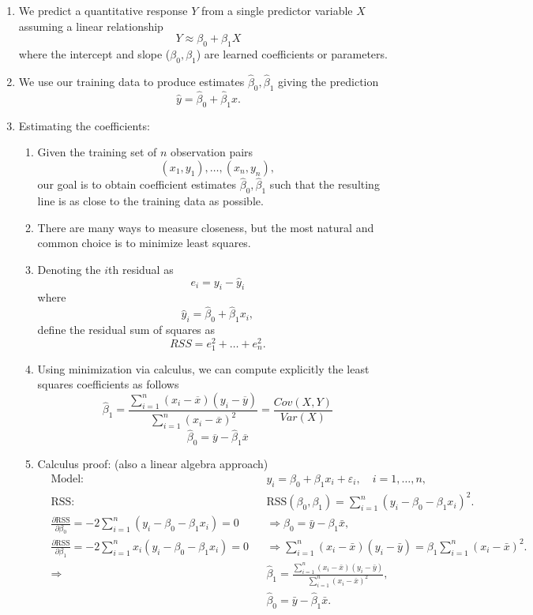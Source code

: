 \documentclass{article}
\begin{document}
\begin{enumerate}
\item We predict a quantitative response $Y$ from a single predictor variable $X$ assuming a linear relationship
\[
Y \approx \beta_0 + \beta_1 X
\]
where the intercept and slope ($\beta_0, \beta_1$) are learned coefficients or parameters.

\item We use our training data to produce estimates $\hat{\beta}_0, \hat{\beta}_1$ giving the prediction
\[
\hat{y} = \hat{\beta}_0 + \hat{\beta}_1 x.
\]

\item Estimating the coefficients:
\begin{enumerate}
\item Given the training set of $n$ observation pairs
\[
(x_1, y_1), \dots , (x_n, y_n),
\]
our goal is to obtain coefficient estimates $\hat{\beta}_0, \hat{\beta}_1$ such that the resulting line is as close to the training data as possible. 
\item There are many ways to measure closeness, but the most natural and common choice is to minimize least squares.
\item Denoting the $i$th residual as 
\[
e_i = y_i - \hat{y}_i
\]
where
\[
\hat{y}_i = \hat{\beta}_0 + \hat{\beta}_1 x_i,
\]
define the residual sum of squares as
\[
RSS = e_1^2 + \dots + e_n^2.
\]
\item Using minimization via calculus, we can compute explicitly the least squares coefficients as follows
\[
\hat{\beta}_1 = \frac{\sum_{i=1}^n (x_i - \overline{x})(y_i - \overline{y})}{\sum_{i=1}^n (x_i - \overline{x})^2} = \frac{Cov(X,Y)}{Var(X)}
\]\[
\hat{\beta}_0 = \overline{y}-\hat{\beta}_1\overline{x}
\]
\item Calculus proof: (also a linear algebra approach)
\begin{align*}
&\text{Model:} && y_i = \beta_0 + \beta_1 x_i + \varepsilon_i, \quad i = 1,\dots,n, \\[2pt]
&\text{RSS:} && \mathrm{RSS}(\beta_0,\beta_1) = \sum_{i=1}^n (y_i - \beta_0 - \beta_1 x_i)^2. \\[4pt]
&\frac{\partial \mathrm{RSS}}{\partial \beta_0} = -2 \sum_{i=1}^n (y_i - \beta_0 - \beta_1 x_i) = 0 
&&\Rightarrow \beta_0 = \bar{y} - \beta_1 \bar{x}, \\[4pt]
&\frac{\partial \mathrm{RSS}}{\partial \beta_1} = -2 \sum_{i=1}^n x_i (y_i - \beta_0 - \beta_1 x_i) = 0
&&\Rightarrow \sum_{i=1}^n (x_i - \bar{x})(y_i - \bar{y}) = \beta_1 \sum_{i=1}^n (x_i - \bar{x})^2. \\[4pt]
&\Rightarrow && \hat{\beta}_1 = \frac{\sum_{i=1}^n (x_i - \bar{x})(y_i - \bar{y})}{\sum_{i=1}^n (x_i - \bar{x})^2}, \\[4pt]
& && \hat{\beta}_0 = \bar{y} - \hat{\beta}_1 \bar{x}.
\end{align*}


\end{enumerate}
\end{enumerate}
\end{document}
